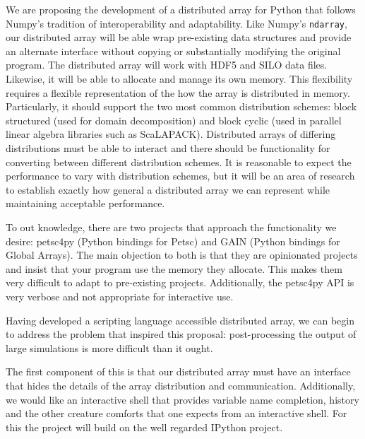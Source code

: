 \documentclass[letterpaper,12pt]{article}
\begin{document}
We are proposing the development of a distributed array for Python that follows Numpy's tradition of interoperability and adaptability.  Like Numpy's \texttt{ndarray}, our distributed array will be able wrap pre-existing data structures and provide an alternate interface without copying or substantially modifying the original program.  The distributed array will work with HDF5\cite{HDF5} and SILO data files.  Likewise, it will be able to allocate and manage its own memory.  This flexibility requires a flexible representation of the how the array is distributed in memory.  Particularly, it should support the two most common distribution schemes: block structured (used for domain decomposition) and block cyclic (used in parallel linear algebra libraries such as ScaLAPACK\cite{scalapack}).  Distributed arrays of differing distributions must be able to interact and there should be functionality for converting between different distribution schemes.  It is reasonable to expect the performance to vary with distribution schemes, but it will be an area of research to establish exactly how general a distributed array we can represent while maintaining acceptable performance.

To out knowledge, there are two projects that approach the functionality we desire: petsc4py\cite{petsc4py-web-page} (Python bindings for Petsc\cite{petsc-user-ref}) and GAIN\cite{global-arrays-python} (Python bindings for Global Arrays\cite{global-arrays}).  The main objection to both is that they are opinionated projects and insist that your program use the memory they allocate.  This makes them very difficult to adapt to pre-existing projects.  Additionally, the petsc4py API is very verbose and not appropriate for interactive use.

Having developed a scripting language accessible distributed array, we can begin to address the problem that inspired this proposal: post-processing the output of large simulations is more difficult than it ought.  
  
The first component of this is that our distributed array must have an interface that hides the details of the array distribution and communication.  Additionally, we would like an interactive shell that provides variable name completion, history and the other creature comforts that one expects from an interactive shell.  For this the project will build on the well regarded IPython project.
\end{document}
